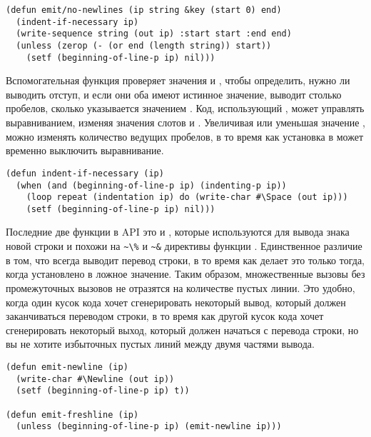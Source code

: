 \begin{lstlisting}
(defun emit/no-newlines (ip string &key (start 0) end)
  (indent-if-necessary ip)
  (write-sequence string (out ip) :start start :end end)
  (unless (zerop (- (or end (length string)) start))
    (setf (beginning-of-line-p ip) nil)))
\end{lstlisting}

Вспомогательная функция  проверяет значения
 и , чтобы определить, нужно ли выводить
отступ, и если они оба имеют истинное значение, выводит столько пробелов, сколько
указывается значением . Код, использующий ,
может управлять выравниванием, изменяя значения слотов  и
. Увеличивая или уменьшая значение , можно изменять
количество ведущих пробелов, в то время как установка  в 
может временно выключить выравнивание.

\begin{lstlisting}
(defun indent-if-necessary (ip)
  (when (and (beginning-of-line-p ip) (indenting-p ip))
    (loop repeat (indentation ip) do (write-char #\Space (out ip)))
    (setf (beginning-of-line-p ip) nil)))
\end{lstlisting}

Последние две функции в API  это  и
, которые используются для вывода знака новой строки и похожи на
\lstinline!~\%! и \lstinline!~&! директивы функции . Единственное различие в
том, что  всегда выводит перевод строки, в то время как
 делает это только тогда, когда 
установлено в ложное значение. Таким образом, множественные вызовы 
без промежуточных вызовов  не отразятся на количестве пустых линии. Это удобно,
когда один кусок кода хочет сгенерировать некоторый вывод, который должен заканчиваться
переводом строки, в то время как другой кусок кода хочет сгенерировать некоторый выход,
который должен начаться с перевода строки, но вы не хотите избыточных пустых линий между
двумя частями вывода.

\begin{lstlisting}
(defun emit-newline (ip)
  (write-char #\Newline (out ip))
  (setf (beginning-of-line-p ip) t))

(defun emit-freshline (ip)
  (unless (beginning-of-line-p ip) (emit-newline ip)))
\end{lstlisting}

